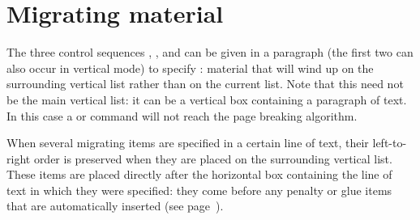 \documentclass{book}
\begin{document}
\section{Migrating material}
\label{migrate}

The three control sequences , , and 
can be given in a paragraph 
(the first two can also occur
in vertical mode) to specify :
material that will wind up on the
surrounding vertical list rather than on the current list.
Note that this need not be 
the main vertical list: it can be a vertical box
containing a paragraph of text. In this case a 
or  command will not reach the page breaking algorithm.

When several migrating items are specified in a certain line
of text, their left-to-right order is preserved when they are
placed on the surrounding vertical list. These items are placed
directly after the horizontal box containing the line of text
in which they were specified: they come before any
penalty or glue items that are automatically inserted
(see page~\pageref{between:lines}).

\end{document}
